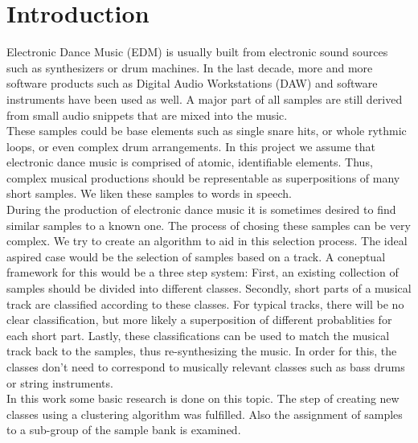 \section{Introduction}
\label{sec:Introduction}
Electronic Dance Music (EDM) is usually built from electronic sound sources such as synthesizers or drum machines. In the last decade, more and more software products such as Digital Audio Workstations (DAW) and software instruments have been used as well. A major part of all samples are still derived from small audio snippets that are mixed into the music.\\
These samples could be base elements such as single snare hits, or whole rythmic loops, or even complex drum arrangements. In this project we assume that electronic dance music is comprised of atomic, identifiable elements. Thus, complex musical productions should be representable as superpositions of many short samples. We liken these samples to words in speech.\\
During the production of electronic dance music it is sometimes desired to find similar samples to a known one. The process of chosing these samples can be very complex. We try to create an algorithm to aid in this selection process. The ideal aspired case would be the selection of samples based on a track. A coneptual framework for this would be a three step system: First, an existing collection of samples should be divided into different classes. Secondly, short parts of a musical track are classified according to these classes. For typical tracks, there will be no clear classification, but more likely a superposition of different probablities for each short part. Lastly, these classifications can be used to match the musical track back to the samples, thus re-synthesizing the music. In order for this, the classes don't need to correspond to musically relevant classes such as bass drums or string instruments.\\
In this work some basic research is done on this topic. The step of creating new classes using a clustering algorithm was fulfilled. Also the assignment of samples to a sub-group of the sample bank is examined.
